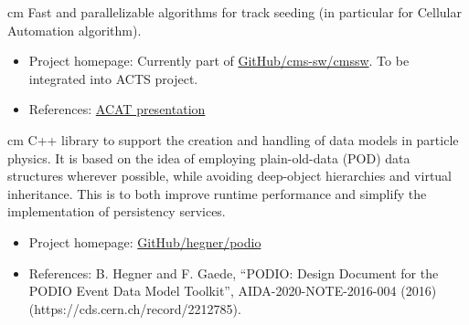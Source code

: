  cm  
Fast and parallelizable algorithms for track seeding (in particular for Cellular Automation algorithm).
\begin{itemize}
\item Project homepage: Currently part of \href{https://github.com/cms-sw/cmssw}{GitHub/cms-sw/cmssw}. To be integrated into ACTS project.
\item References: \href{https://indico.cern.ch/event/577003/.../Felice_seeding.pptx}{ACAT presentation} 
\end{itemize}

 cm 
C++ library to support the creation and handling of data models in particle physics. It is based on the idea of employing plain-old-data (POD) data structures wherever possible, while avoiding deep-object hierarchies and virtual inheritance. This is to both improve runtime performance and simplify the implementation of persistency services.
\begin{itemize}
\item Project homepage: \href{https://github.com/hegner/podio}{GitHub/hegner/podio} 
\item References: B. Hegner and F. Gaede, “PODIO: Design Document for the PODIO Event Data Model Toolkit”, AIDA-2020-NOTE-2016-004 (2016) (https://cds.cern.ch/record/2212785). 
\end{itemize}
